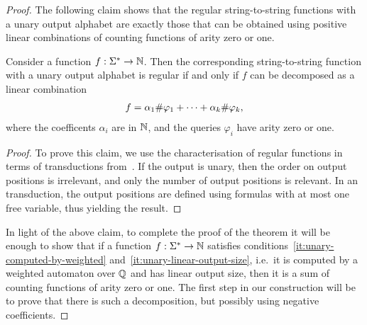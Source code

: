 \begin{proof}
The following claim shows that the regular string-to-string  functions with a unary output alphabet  are exactly those that can be obtained using positive linear combinations of \mso counting functions of arity zero or one.
    \begin{claim}\label{claim:mso-counting-regular}
        Consider a function $f : \Sigma^* \to {\mathbb N}$. Then the corresponding string-to-string function with a unary output alphabet is regular if and only if $f$  can be decomposed as  a linear combination 
        \begin{align*}
        f = \alpha_1 \#{\varphi_1} + \cdots +  \alpha_k \#{\varphi_k},
        \end{align*}        
        where the coefficents $\alpha_i$ are in ${\mathbb N}$, and the queries $\varphi_i$ have arity zero or one.
    \end{claim}
    \begin{proof}
        To prove this claim, we use the characterisation of regular functions in terms of \mso transductions from~\cite[Section 4]{engelfrietMSODefinableString2001}. If the output is unary, then the order on output positions is irrelevant, and only the number of output positions is relevant. In an \mso transduction, the output positions are defined using \mso formulas with at most one free variable, thus yielding the result. 
    \end{proof}

In light of the above claim, to complete the proof of the theorem it will be enough to show that if a function $f : \Sigma^* \to {\mathbb N}$ satisfies conditions~\ref{it:unary-computed-by-weighted} and~\ref{it:unary-linear-output-size}, i.e.~it is computed by a weighted automaton over ${\mathbb Q}$ and has linear output size, then it is a sum of \mso counting functions of arity zero or one. The first step in our construction will be to prove that there is such a decomposition, but possibly using negative coefficients.


\end{proof}
